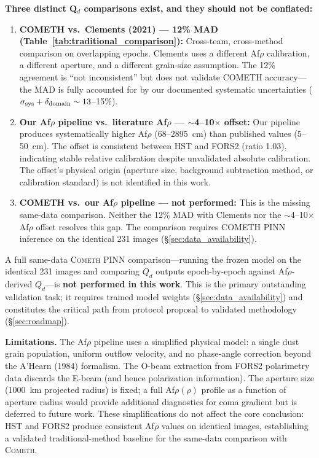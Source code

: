 \documentclass[usenatbib]{mnras}
\begin{document}
\textbf{Three distinct Q$_d$ comparisons exist, and they should not be conflated:}
\begin{enumerate}
    \item \textbf{COMETH vs.\ Clements (2021) --- 12\% MAD (Table~\ref{tab:traditional_comparison}):} Cross-team, cross-method comparison on overlapping epochs. Clements uses a different Af$\rho$ calibration, a different aperture, and a different grain-size assumption. The 12\% agreement is ``not inconsistent'' but does not validate COMETH accuracy---the MAD is fully accounted for by our documented systematic uncertainties ($\sigma_{\rm sys} + \delta_{\rm domain} \sim 13$--15\%).
    \item \textbf{Our Af$\rho$ pipeline vs.\ literature Af$\rho$ --- $\sim$4--10$\times$ offset:} Our pipeline produces systematically higher Af$\rho$ (68--2895~cm) than published values (5--50~cm). The offset is consistent between HST and FORS2 (ratio 1.03), indicating stable relative calibration despite unvalidated absolute calibration. The offset's physical origin (aperture size, background subtraction method, or calibration standard) is not identified in this work.
    \item \textbf{COMETH vs.\ our Af$\rho$ pipeline --- not performed:} This is the missing same-data comparison. Neither the 12\% MAD with Clements nor the $\sim$4--10$\times$ Af$\rho$ offset resolves this gap. The comparison requires COMETH PINN inference on the identical 231 images (\S\ref{sec:data_availability}).
\end{enumerate} A full same-data \textsc{Cometh} PINN comparison---running the frozen model on the identical 231 images and comparing $Q_d$ outputs epoch-by-epoch against Af$\rho$-derived $Q_d$---is \textbf{not performed in this work}. This is the primary outstanding validation task; it requires trained model weights (\S\ref{sec:data_availability}) and constitutes the critical path from protocol proposal to validated methodology (\S\ref{sec:roadmap}).

\textbf{Limitations.} The Af$\rho$ pipeline uses a simplified physical model: a single dust grain population, uniform outflow velocity, and no phase-angle correction beyond the A'Hearn (1984) formalism. The O-beam extraction from FORS2 polarimetry data discards the E-beam (and hence polarization information). The aperture size (1000~km projected radius) is fixed; a full Af$\rho(\rho)$ profile as a function of aperture radius would provide additional diagnostics for coma gradient but is deferred to future work. These simplifications do not affect the core conclusion: HST and FORS2 produce consistent Af$\rho$ values on identical images, establishing a validated traditional-method baseline for the same-data comparison with \textsc{Cometh}.
\end{document}
